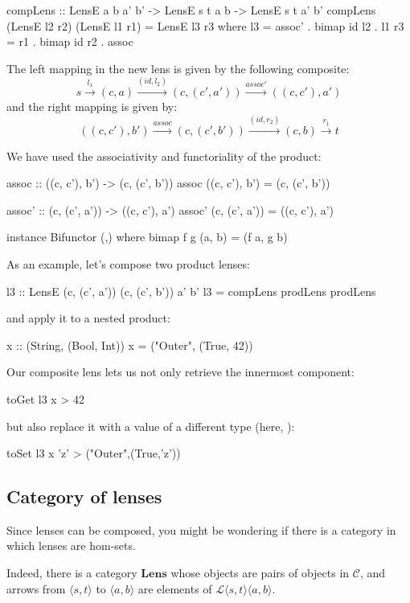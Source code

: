 \documentclass[DaoFP]{subfiles}
\begin{document}
\begin{haskell}
compLens :: LensE a b a' b' -> LensE s t a b -> LensE s t a' b'
compLens (LensE l2 r2) (LensE l1 r1) = LensE l3 r3
  where l3 = assoc' . bimap id l2  . l1
        r3 = r1 . bimap id r2 . assoc
\end{haskell}
The left mapping in the new lens is given by the following composite:
\[ s \xrightarrow{l_1} (c, a)   \xrightarrow{(id, l_2)} (c, (c', a'))  \xrightarrow{assoc'} ((c, c'), a')\]
and the right mapping is given by:
\[ ((c, c'), b') \xrightarrow{assoc}  (c, (c', b')) \xrightarrow{(id, r_2)} (c, b) \xrightarrow{r_1} t \]

We have used the associativity and functoriality of the product:
\begin{haskell}
assoc :: ((c, c'), b') -> (c, (c', b'))
assoc ((c, c'), b') = (c, (c', b'))

assoc' :: (c, (c', a')) -> ((c, c'), a')
assoc' (c, (c', a')) = ((c, c'), a')

instance Bifunctor (,) where
  bimap f g (a, b) = (f a, g b)
\end{haskell}

As an example, let's compose two product lenses:
\begin{haskell}
l3 :: LensE (c, (c', a')) (c, (c', b')) a' b'
l3 = compLens prodLens prodLens
\end{haskell}
and apply it to a nested product:
\begin{haskell}
x :: (String, (Bool, Int))
x = ("Outer", (True, 42))
\end{haskell}
Our composite lens lets us not only retrieve the innermost component:
\begin{haskell}
toGet l3 x
> 42
\end{haskell}
but also replace it with a value of a different type (here, ):
\begin{haskell}
toSet l3 x 'z'
> ("Outer",(True,'z'))
\end{haskell}

\subsection{Category of lenses}

Since lenses can be composed, you might be wondering if there is a category in which lenses are hom-sets. 

Indeed, there is a category $\mathbf{Lens}$ whose objects are pairs of objects in $\mathcal{C}$, and arrows from $\langle s, t\rangle$ to $ \langle a, b \rangle$ are elements of  $\mathcal{L} \langle s, t\rangle \langle a, b \rangle$.
\end{document}
